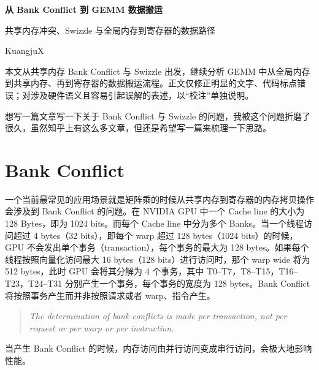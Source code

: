 \documentclass[11pt,a4paper]{article}
\begin{document}
\begin{titlepage}\centering\vspace*{18mm}{\bfseries GPU MEMORY · TECHNICAL ESSAY}\par\vspace{12mm}
{\Huge\bfseries 从 Bank Conflict 到 GEMM 数据搬运\par}\vspace{5mm}
{\Large 共享内存冲突、Swizzle 与全局内存到寄存器的数据路径\par}\vfill
{\large KuangjuX\par}\vspace{3mm}{\large 2026 年 9 月排印版\par}\vspace{20mm}
\begin{minipage}{0.82\textwidth}\small
本文从共享内存 Bank Conflict 与 Swizzle 出发，继续分析 GEMM 中从全局内存到共享内存、再到寄存器的数据搬运流程。正文仅修正明显的文字、代码标点错误；对涉及硬件语义且容易引起误解的表述，以“校注”单独说明。
\end{minipage}
\end{titlepage}
\tableofcontents
\clearpage

想写一篇文章写一下关于 Bank Conflict 与 Swizzle 的问题，我被这个问题折磨了很久，虽然知乎上有这么多文章，但还是希望写一篇来梳理一下思路。

\section{Bank Conflict}

一个当前最常见的应用场景就是矩阵乘的时候从共享内存到寄存器的内存拷贝操作会涉及到 Bank Conflict 的问题。在 NVIDIA GPU 中一个 Cache line 的大小为 128 Bytes，即为 1024 bits。而每个 Cache line 中分为多个 Banks。当一个线程访问超过 4 bytes（32 bits），即每个 warp 超过 128 bytes（1024 bits）的时候，GPU 不会发出单个事务（transaction），每个事务的最大为 128 bytes。如果每个线程按照向量化访问最大 16 bytes（128 bits）进行访问时，那个 warp wide 将为 512 bytes，此时 GPU 会将其分解为 4 个事务，其中 T0--T7，T8--T15，T16--T23，T24--T31 分别产生一个事务，每个事务的宽度为 128 bytes。Bank Conflict 将按照事务产生而并非按照请求或者 warp、指令产生。

\begin{quote}\itshape
The determination of bank conflicts is made per transaction, not per request or per warp or per instruction.
\end{quote}

当产生 Bank Conflict 的时候，内存访问由并行访问变成串行访问，会极大地影响性能。
\end{document}
